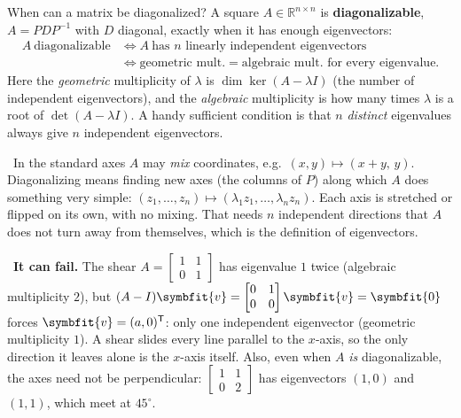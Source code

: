 \documentclass[11pt]{article}
\newcommand{\bm}[1]{\symbfit{#1}}
\newcounter{keyfact}
\newcommand{\why}{\par\smallskip{\color{intgreen}\textbf{Why.}}\ }
\newcommand{\sowhat}{\par\smallskip{\color{corpurple}\textbf{So what.}}\ }
\newcommand{\R}{\mathbb{R}}
\newcommand{\T}{^{\mathsf T}}
\begin{document}
\begin{keyfactbox}{When can a matrix be diagonalized?}\label{kf:diag}
A square $A\in\R^{n\times n}$ is \textbf{diagonalizable}, $A=PDP^{-1}$ with $D$ diagonal, exactly when it has enough eigenvectors:
\[
\boxed{\begin{aligned}
A\ \text{diagonalizable}&\iff A\ \text{has $n$ linearly independent eigenvectors}\\
&\iff \text{geometric mult.}=\text{algebraic mult.\ for every eigenvalue.}
\end{aligned}}
\]
Here the \emph{geometric} multiplicity of $\lambda$ is $\dim\ker(A-\lambda I)$ (the number of independent eigenvectors), and the
\emph{algebraic} multiplicity is how many times $\lambda$ is a root of $\det(A-\lambda I)$. A handy sufficient condition is that
$n$ \emph{distinct} eigenvalues always give $n$ independent eigenvectors.
\why In the standard axes $A$ may \emph{mix} coordinates, e.g.\ $(x,y)\mapsto(x+y,\,y)$. Diagonalizing means finding new axes
(the columns of $P$) along which $A$ does something very simple: $(z_1,\dots,z_n)\mapsto(\lambda_1z_1,\dots,\lambda_nz_n)$. Each
axis is stretched or flipped on its own, with no mixing. That needs $n$ independent directions that $A$ does not turn
away from themselves, which is the definition of eigenvectors.
\sowhat \textbf{It can fail.} The shear $A=\begin{bmatrix}1&1\\0&1\end{bmatrix}$ has eigenvalue $1$ twice (algebraic multiplicity
$2$), but $(A-I)\bm v=\begin{bmatrix}0&1\\0&0\end{bmatrix}\bm v=\bm0$ forces $\bm v=(a,0)\T$: only one independent eigenvector
(geometric multiplicity $1$). A shear slides every line parallel to the $x$-axis, so the only direction it leaves
alone is the $x$-axis itself. Also, even when $A$ \emph{is} diagonalizable, the axes need not be perpendicular:
$\begin{bmatrix}1&1\\0&2\end{bmatrix}$ has eigenvectors $(1,0)$ and $(1,1)$, which meet at $45^\circ$.
\end{keyfactbox}
\end{document}
